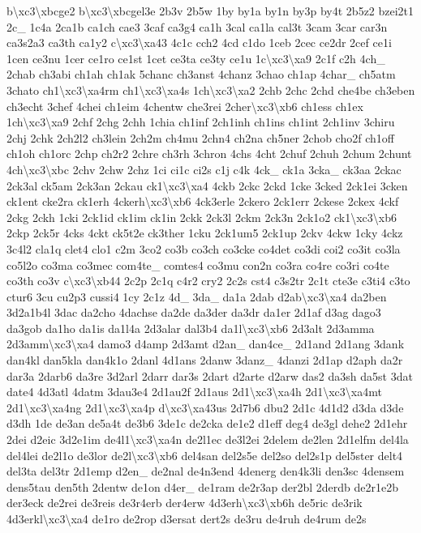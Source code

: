 \begin{DoxyCompactItemize}
b\textbackslash{}xc3\textbackslash{}xbcge2 b\textbackslash{}xc3\textbackslash{}xbcgel3e 2b3v 2b5w 1by by1a by1n by3p by4t 2b5z2 bzei2t1 2c\-\_\- 1c4a 2ca1b ca1ch cae3 3caf ca3g4 ca1h 3cal ca1la cal3t 3cam 3car car3n ca3s2a3 ca3th ca1y2 c\textbackslash{}xc3\textbackslash{}xa43 4c1c cch2 4cd c1do 1ceb 2cec ce2dr 2cef ce1i 1cen ce3nu 1cer ce1ro ce1st 1cet ce3ta ce3ty ce1u 1c\textbackslash{}xc3\textbackslash{}xa9 2c1f c2h 4ch\-\_\- 2chab ch3abi ch1ah ch1ak 5chanc ch3anst 4chanz 3chao ch1ap 4char\-\_\- ch5atm 3chato ch1\textbackslash{}xc3\textbackslash{}xa4rm ch1\textbackslash{}xc3\textbackslash{}xa4s 1ch\textbackslash{}xc3\textbackslash{}xa2 2chb 2chc 2chd che4be ch3eben ch3echt 3chef 4chei ch1eim 4chentw che3rei 2cher\textbackslash{}xc3\textbackslash{}xb6 ch1ess ch1ex 1ch\textbackslash{}xc3\textbackslash{}xa9 2chf 2chg 2chh 1chia ch1inf 2ch1inh ch1ins ch1int 2ch1inv 3chiru 2chj 2chk 2ch2l2 ch3lein 2ch2m ch4mu 2chn4 ch2na ch5ner 2chob cho2f ch1off ch1oh ch1orc 2chp ch2r2 2chre ch3rh 3chron 4chs 4cht 2chuf 2chuh 2chum 2chunt 4ch\textbackslash{}xc3\textbackslash{}xbc 2chv 2chw 2chz 1ci ci1c ci2s c1j c4k 4ck\-\_\- ck1a 3cka\-\_\- ck3aa 2ckac 2ck3al ck5am 2ck3an 2ckau ck1\textbackslash{}xc3\textbackslash{}xa4 4ckb 2ckc 2ckd 1cke 3cked 2ck1ei 3cken ck1ent cke2ra ck1erh 4ckerh\textbackslash{}xc3\textbackslash{}xb6 4ck3erle 2ckero 2ck1err 2ckese 2ckex 4ckf 2ckg 2ckh 1cki 2ck1id ck1im ck1in 2ckk 2ck3l 2ckm 2ck3n 2ck1o2 ck1\textbackslash{}xc3\textbackslash{}xb6 2ckp 2ck5r 4cks 4ckt ck5t2e ck3ther 1cku 2ck1um5 2ck1up 2ckv 4ckw 1cky 4ckz 3c4l2 cla1q clet4 clo1 c2m 3co2 co3b co3ch co3cke co4det co3di coi2 co3it co3la co5l2o co3ma co3mec com4te\-\_\- comtes4 co3mu con2n co3ra co4re co3ri co4te co3th co3v c\textbackslash{}xc3\textbackslash{}xb44 2c2p 2c1q c4r2 cry2 2c2s cst4 c3s2tr 2c1t cte3e c3ti4 c3to ctur6 3cu cu2p3 cussi4 1cy 2c1z 4d\-\_\- 3da\-\_\- da1a 2dab d2ab\textbackslash{}xc3\textbackslash{}xa4 da2ben 3d2a1b4l 3dac da2cho 4dachse da2de da3der da3dr da1er 2d1af d3ag dago3 da3gob da1ho da1is da1l4a 2d3alar dal3b4 da1l\textbackslash{}xc3\textbackslash{}xb6 2d3alt 2d3amma 2d3amm\textbackslash{}xc3\textbackslash{}xa4 damo3 d4amp 2d3amt d2an\-\_\- dan4ce\-\_\- 2d1and 2d1ang 3dank dan4kl dan5kla dan4k1o 2danl 4d1ans 2danw 3danz\-\_\- 4danzi 2d1ap d2aph da2r dar3a 2darb6 da3re 3d2arl 2darr dar3s 2dart d2arte d2arw das2 da3sh da5st 3dat date4 4d3atl 4datm 3dau3e4 2d1au2f 2d1aus 2d1\textbackslash{}xc3\textbackslash{}xa4h 2d1\textbackslash{}xc3\textbackslash{}xa4mt 2d1\textbackslash{}xc3\textbackslash{}xa4ng 2d1\textbackslash{}xc3\textbackslash{}xa4p d\textbackslash{}xc3\textbackslash{}xa43us 2d7b6 dbu2 2d1c 4d1d2 d3da d3de d3dh 1de de3an de5a4t de3b6 3de1c de2cka de1e2 d1eff deg4 de3gl dehe2 2d1ehr 2dei d2eic 3d2e1im de4l1\textbackslash{}xc3\textbackslash{}xa4n de2l1ec de3l2ei 2delem de2len 2d1elfm del4la del4lei de2l1o de3lor de2l\textbackslash{}xc3\textbackslash{}xb6 del4san del2s5e del2so del2s1p del5ster delt4 del3ta del3tr 2d1emp d2en\-\_\- de2nal de4n3end 4denerg den4k3li den3sc 4densem dens5tau den5th 2dentw de1on d4er\-\_\- de1ram de2r3ap der2bl 2derdb de2r1e2b der3eck de2rei de3reis de3r4erb der4erw 4d3erh\textbackslash{}xc3\textbackslash{}xb6h de5ric de3rik 4d3erkl\textbackslash{}xc3\textbackslash{}xa4 de1ro de2rop d3ersat dert2s de3ru de4ruh de4rum de2s 
\end{DoxyCompactItemize}
